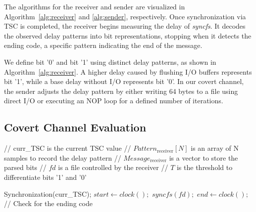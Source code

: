 

The algorithms for the receiver and sender are visualized in Algorithm~\ref{alg:receiver} and \ref{alg:sender}, respectively. Once synchronization via TSC is completed, the receiver begins measuring the delay of \textit{syncfs}. It decodes the observed delay patterns into bit representations, stopping when it detects the ending code, a specific pattern indicating the end of the message. 

We define bit '0' and bit '1' using distinct delay patterns, as shown in Algorithm~\ref{alg:receiver}. A higher delay caused by flushing I/O buffers represents bit '1', while a base delay without I/O represents bit '0'. In our covert channel, the sender adjusts the delay pattern by either writing 64 bytes to a file using direct I/O or executing an NOP loop for a defined number of iterations.





\subsection{Covert Channel Evaluation}
\label{subsec:covert_evaluation}


\begin{algorithm}[t]
\caption{Receiver for Covert Channel} \label{alg:receiver}
\begin{algorithmic}[1]
\State // curr\_TSC is the current TSC value  
\State // $Pattern_{\text{receiver}}[N]$ is an array of N samples to record the delay pattern
\State // $Message_{\text{receiver}}$ is a vector to store the parsed bits
\State // $fd$ is a file controlled by the receiver
\State // $T$ is the threshold to differentiate bits '1' and '0'


\State Synchronization(curr\_TSC);
    \State $start \gets clock();$
    \State $syncfs(fd);$
    \State $end \gets clock();$
    \State // Check for the ending code
\EndFor


\end{algorithmic}
\end{algorithm}

